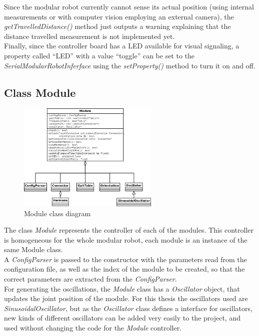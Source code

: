 Since the modular robot currently cannot sense its actual position (using internal measurements or with computer vision employing an external camera), the \emph{getTravelledDistance()} method just outputs a warning explaining that the distance travelled measurement is not implemented yet.\\

Finally, since the controller board has a LED available for visual signaling, a property called ``LED'' with a value ``toggle'' can be set to the \emph{SerialModularRobotInferface} using the \emph{setProperty()} method to turn it on and off.\\


\subsection{Class Module}
\label{software_class_module}

\begin{figure}[h]
		\centering
        \includegraphics[width=0.6\textwidth]{images/Class_diagram_Module.png}
        \caption{Module class diagram}\label{fig:software_class_module_class}
\end{figure}

The class \emph{Module} represents the controller of each of the modules. This controller is homogeneous for the whole modular robot, each module is an instance of the same Module class.\\

A \emph{ConfigParser} is passed to the constructor with the parameters read from the configuration file, as well as the index of the module to be created, so that the correct parameters are extracted from the \emph{ConfigParser}.\\

For generating the oscillations, the \emph{Module} class has a \emph{Oscillator} object, that updates the joint position of the module. For this thesis the oscillators used are \emph{SinusoidalOscillator}, but as the \emph{Oscillator} class defines a interface for oscillators, new kinds of different oscillators can be added very easily to the project, and used without changing the code for the \emph{Module} controller.\\

